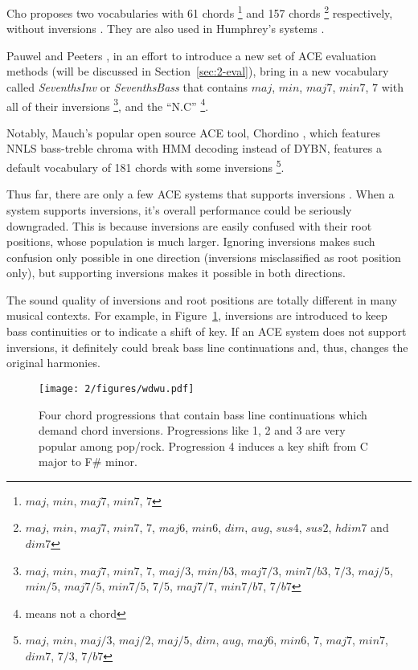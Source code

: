 Cho \cite{cho2014improved} proposes two vocabularies with 61 chords \footnote{$maj$, $min$, $maj7$, $min7$, $7$} and 157 chords \footnote{$maj$, $min$, $maj7$, $min7$, $7$, $maj6$, $min6$, $dim$, $aug$, $sus4$, $sus2$, $hdim7$ and $dim7$} respectively, without inversions \cite{burgoyne2014comparative}. They are also used in Humphrey's systems \cite{humphreyfour,humphrey2015exploration}.

Pauwel and Peeters \cite{pauwels2013evaluating}, in an effort to introduce a new set of ACE evaluation methods (will be discussed in Section~\ref{sec:2-eval}), bring in a new vocabulary called \textit{SeventhsInv} or \textit{SeventhsBass} that contains $maj$, $min$, $maj7$, $min7$, $7$ with all of their inversions \footnote{$maj$, $min$, $maj7$, $min7$, $7$, $maj/3$, $min/b3$, $maj7/3$, $min7/b3$, $7/3$, $maj/5$, $min/5$, $maj7/5$, $min7/5$, $7/5$, $maj7/7$, $min7/b7$, $7/b7$}, and the ``N.C'' \footnote{means not a chord}.

Notably, Mauch's popular open source ACE tool, Chordino \cite{cannam2010sonic}, which features NNLS bass-treble chroma with HMM decoding instead of DYBN, features a default vocabulary of 181 chords with some inversions \footnote{$maj$, $min$, $maj/3$, $maj/2$, $maj/5$, $dim$, $aug$, $maj6$, $min6$, $7$, $maj7$, $min7$, $dim7$, $7/3$, $7/b7$}.

Thus far, there are only a few ACE systems that supports inversions \cite{cannam2010sonic,mauch2010automatic,ni2012end,mcvicar2013machine}. When a system supports inversions, it's overall performance could be seriously downgraded. This is because inversions are easily confused with their root positions, whose population is much larger. Ignoring inversions makes such confusion only possible in one direction (inversions misclassified as root position only), but supporting inversions makes it possible in both directions.

The sound quality of inversions and root positions are totally different in many musical contexts. For example, in Figure~\ref{fig:2-wdwu}, inversions are introduced to keep bass continuities or to indicate a shift of key. If an ACE system does not support inversions, it definitely could break bass line continuations and, thus, changes the original harmonies.
\begin{figure}[htb]
\centering
\texttt{[image: 2/figures/wdwu.pdf]}
\caption{Four chord progressions that contain bass line continuations which demand chord inversions. Progressions like 1, 2 and 3 are very popular among pop/rock. Progression 4 induces a key shift from C major to F\# minor.}
\label{fig:2-wdwu}
\end{figure}

